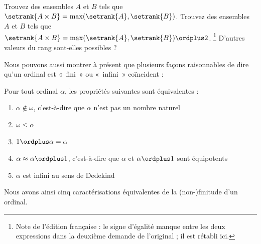 \documentclass[../../../include/open-logic-section]{subfiles}
\begin{document}
\begin{prob}
Trouvez des ensembles $A$ et $B$ tels que
$\setrank{A \times B} =
\max(\setrank{A}, \setrank{B})$.
Trouvez des ensembles $A$ et $B$ tels que
$\setrank{A \times B} =
\max(\setrank{A}, \setrank{B}) \ordplus 2$.
\footnote{Note de l'édition française : le signe
d'égalité manque entre les deux expressions dans
la deuxième demande de l'original ; il est rétabli
ici.} D'autres valeurs du rang sont-elles possibles ?
\end{prob}

Nous pouvons aussi montrer à présent que plusieurs
façons raisonnables de dire qu'un ordinal est «~fini~»
ou «~infini~» coïncident :

\begin{lem}
Pour tout ordinal $\alpha$, les propriétés suivantes
sont équivalentes :
\begin{enumerate}
	\item{}
	$\alpha\notin \omega$, c'est-à-dire que
	$\alpha$ n'est pas un nombre naturel
	\item{} $\omega \leq \alpha$
	\item{}
	$1 \ordplus \alpha = \alpha$
	\item{}
	$\alpha \approx \alpha\ordplus 1$,
	c'est-à-dire que $\alpha$ et
	$\alpha\ordplus 1$ sont équipotents
	\item{}
	$\alpha$ est infini au sens de Dedekind
\end{enumerate}
\end{lem}
\noindent
Nous avons ainsi cinq caractérisations équivalentes
de la (non-)finitude d'un ordinal.
\end{document}
